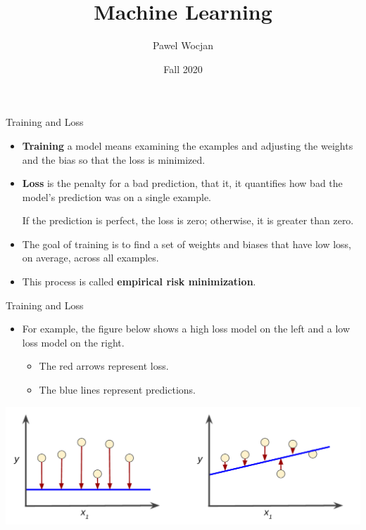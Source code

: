 \documentclass{beamer}
\title[ML]{Machine Learning}
\author{Pawel Wocjan}
\institute{University of Central Florida}
\date{Fall 2020}
\begin{document}
\begin{frame}
  \titlepage
\end{frame}


\begin{frame}{Training and Loss}
\begin{itemize}
\item {\bf Training} a model means examining the examples and adjusting the weights and the bias so that the loss is minimized.

\medskip    
\item {\bf Loss} is the penalty for a bad prediction, that it, it quantifies how bad the model's prediction was on a single example. 

\medskip
If the prediction is perfect, the loss is zero; otherwise, it is greater than zero. 

\medskip   
\item The goal of training is to find a set of weights and biases that have low loss, on average, across all examples.

\medskip
\item This process is called {\bf empirical risk minimization}.
\end{itemize}
\end{frame}


\begin{frame}{Training and Loss}
\begin{itemize}
\item For example, the figure below shows a high loss model on the left and a low loss model on the right. 

\medskip
\begin{itemize}
\item The red arrows represent loss.

\medskip
\item The blue lines represent predictions.
\end{itemize}
\end{itemize}
\includegraphics[width=\textwidth]{images/LossSideBySide.png}
\end{frame}
\end{document}
